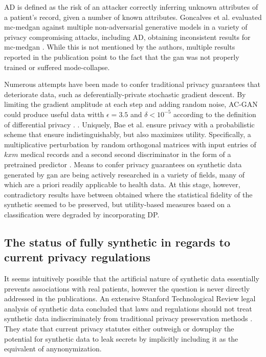     AD is defined as the risk of an attacker correctly inferring unknown attributes of a patient's record, given a number of known attributes. Goncalves et al. evaluated \gls{mc-medgan} against multiple non-adversarial generative models in a variety of privacy compromising attacks, including AD, obtaining inconsistent results for \gls{mc-medgan} \cite{Goncalves2020}. While this is not mentioned by the authors, multiple results reported in the publication point to the fact that the \gls{gan} was not properly trained or suffered mode-collapse.\par
    
    Numerous attempts have been made to confer traditional privacy guarantees that deteriorate data, such as deferentially-private stochastic gradient descent. By limiting the gradient amplitude at each step and adding random noise, AC-GAN could produce useful data witth $\epsilon=3.5$ and $\delta<10^{-5}$ according to the definition of differential privacy \cite{Beaulieu-Jones2019-ct, esteban2017real,chincheong2020generation}. \cite{BaeAnomiGAN2020}. Uniquely, Bae et al. ensure privacy with a probabilistic scheme that ensure indistinguishably, but also maximizes utility. Specifically, a multiplicative perturbation by random orthogonal matrices with input entries of $k x m$ medical records and a second second discriminator in the form of a pretrained  predictor \cite{BaeAnomiGAN2020}. Means to confer privacy guarantees on synthetic data generated by \gls{gan} are being actively researched in a variety of fields, many of which are a priori readily applicable to health data. At this stage, however, contradictory results have between obtained where the statistical fidelity of the synthetic seemed to be preserved, but utility-based measures based on a classification were degraded by incorporating DP.\par
    
    \subsection{The status of fully synthetic in regards to current privacy regulations}
        It seems intuitively possible that the artificial nature of synthetic data essentially prevents associations with real patients, however the question is never directly addressed in the publications. An extensive Stanford Technological Review legal analysis of synthetic data concluded that laws and regulations should not treat synthetic data indiscriminately from traditional privacy preservation methods \cite{bellovin2019privacy}. They state that current privacy statutes either outweigh or downplay the potential for synthetic data to leak secrets by implicitly including it as the equivalent of anynonymization. 
    
